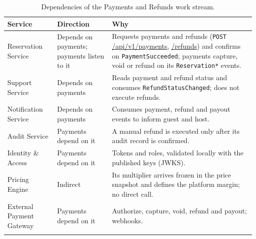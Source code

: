 \begin{longtable}{@{}L{3.0cm}L{2.6cm}L{8.2cm}@{}}
\toprule
\textbf{Service} & \textbf{Direction} & \textbf{Why} \\
\midrule
\endhead
Reservation Service & Depends on payments; payments listen to it &
  Requests payments and refunds (\texttt{POST} \url{/api/v1/payments},
  \url{/refunds}) and confirms on \texttt{Payment\allowbreak Succeeded};
  payments capture, void or refund on its \texttt{Reservation*} events. \\
Support Service & Depends on payments &
  Reads payment and refund status and consumes
  \texttt{Refund\allowbreak Status\allowbreak Changed}; does not execute refunds. \\
Notification Service & Depends on payments &
  Consumes payment, refund and payout events to inform guest and host. \\
Audit Service & Payments depend on it &
  A manual refund is executed only after its audit record is confirmed. \\
Identity \& Access & Payments depend on it &
  Tokens and roles, validated locally with the published keys (JWKS). \\
Pricing Engine & Indirect &
  Its multiplier arrives frozen in the price snapshot and defines the
  platform margin; no direct call. \\
External Payment Gateway & Payments depend on it &
  Authorize, capture, void, refund and payout; webhooks. \\
\bottomrule
\caption{Dependencies of the Payments and Refunds work stream.}
\label{tab:pay-dependencies}
\end{longtable}
\endgroup

